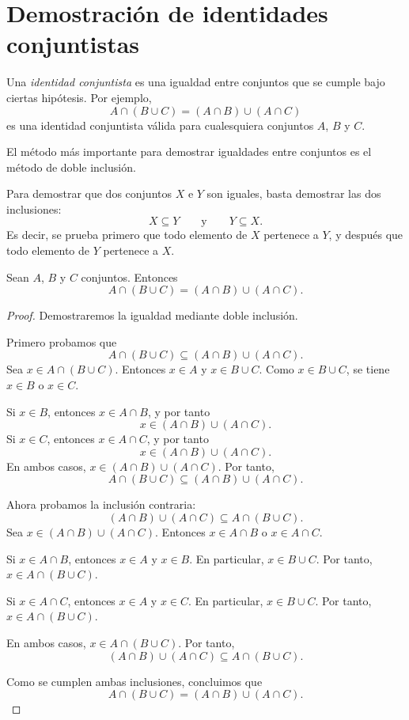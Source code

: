 \section{Demostración de identidades conjuntistas}

Una \emph{identidad conjuntista} es una igualdad entre conjuntos que se cumple bajo ciertas hipótesis. Por ejemplo,
\[
  A\cap(B\cup C)=(A\cap B)\cup(A\cap C)
\]
es una identidad conjuntista válida para cualesquiera conjuntos \(A\), \(B\) y \(C\).

El método más importante para demostrar igualdades entre conjuntos es el método de doble inclusión.

\begin{metodo}
Para demostrar que dos conjuntos \(X\) e \(Y\) son iguales, basta demostrar las dos inclusiones:
\[
  X\subseteq Y
  \qquad\text{y}\qquad
  Y\subseteq X.
\]
Es decir, se prueba primero que todo elemento de \(X\) pertenece a \(Y\), y después que todo elemento de \(Y\) pertenece a \(X\).
\end{metodo}

\begin{proposicion}
Sean \(A\), \(B\) y \(C\) conjuntos. Entonces
\[
  A\cap(B\cup C)=(A\cap B)\cup(A\cap C).
\]
\end{proposicion}

\begin{proof}
Demostraremos la igualdad mediante doble inclusión.

Primero probamos que
\[
  A\cap(B\cup C)\subseteq (A\cap B)\cup(A\cap C).
\]
Sea \(x\in A\cap(B\cup C)\). Entonces \(x\in A\) y \(x\in B\cup C\). Como \(x\in B\cup C\), se tiene \(x\in B\) o \(x\in C\).

Si \(x\in B\), entonces \(x\in A\cap B\), y por tanto
\[
  x\in (A\cap B)\cup(A\cap C).
\]
Si \(x\in C\), entonces \(x\in A\cap C\), y por tanto
\[
  x\in (A\cap B)\cup(A\cap C).
\]
En ambos casos, \(x\in (A\cap B)\cup(A\cap C)\). Por tanto,
\[
  A\cap(B\cup C)\subseteq (A\cap B)\cup(A\cap C).
\]

Ahora probamos la inclusión contraria:
\[
  (A\cap B)\cup(A\cap C)\subseteq A\cap(B\cup C).
\]
Sea \(x\in (A\cap B)\cup(A\cap C)\). Entonces \(x\in A\cap B\) o \(x\in A\cap C\).

Si \(x\in A\cap B\), entonces \(x\in A\) y \(x\in B\). En particular, \(x\in B\cup C\). Por tanto, \(x\in A\cap(B\cup C)\).

Si \(x\in A\cap C\), entonces \(x\in A\) y \(x\in C\). En particular, \(x\in B\cup C\). Por tanto, \(x\in A\cap(B\cup C)\).

En ambos casos, \(x\in A\cap(B\cup C)\). Por tanto,
\[
  (A\cap B)\cup(A\cap C)\subseteq A\cap(B\cup C).
\]

Como se cumplen ambas inclusiones, concluimos que
\[
  A\cap(B\cup C)=(A\cap B)\cup(A\cap C).
\]
\end{proof}

